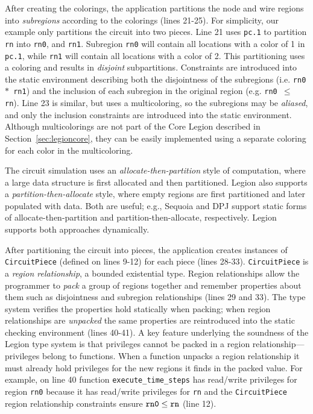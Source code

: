 After creating the colorings, the application partitions the node and wire
regions
into {\em subregions} according to the colorings (lines 21-25).  For
simplicity, our example only partitions the circuit into two pieces.
Line 21 uses {\tt pc.1} to partition {\tt rn} into {\tt rn0}, and {\tt rn1}.
Subregion {\tt rn0} will contain all locations with a color of 1 in {\tt pc.1},
while {\tt rn1} will contain all locations with a color of 2.  This
partitioning uses a coloring and results in {\em disjoint} subpartitions.
Constraints are introduced into the static environment describing both the
disjointness of the subregions (i.e. {\tt rn0 $*$ rn1}) and the inclusion of
each subregion in the original region (e.g. {\tt rn0 $\leq$ rn}).  Line
23 is similar, but uses a multicoloring, so the subregions may be {\em aliased},
and only the inclusion constraints are introduced into the static environment.
Although multicolorings are not part of the Core Legion described in 
Section~\ref{sec:legioncore}, they can be easily implemented using a separate 
coloring for each color in the multicoloring.

The circuit simulation uses an {\em allocate-then-partition} style of
computation, where a large data structure is first allocated and then
partitioned.  Legion also supports a {\em partition-then-allocate} style,
where empty regions are first partitioned and later populated with
data.  Both are useful; e.g., Sequoia \cite{Fatahalian06} and DPJ
\cite{Bocchino09} support static forms of allocate-then-partition and
partition-then-allocate, respectively.  Legion supports both
approaches dynamically.

After partitioning the circuit into pieces, the application creates
instances of {\tt CircuitPiece} (defined on lines 9-12) for each piece
(lines 28-33).  {\tt CircuitPiece} is a {\em region relationship}, a
bounded existential type.  Region relationships allow the programmer
to {\em pack} a group of regions together and remember properties
about them such as disjointness and subregion relationships (lines 29
and 33).  The type system verifies the properties hold statically when
packing; when region relationships are {\em unpacked} the same
properties are reintroduced into the static checking environment
(lines 40-41).  A key feature underlying the soundness of the Legion
type system is that privileges cannot be packed in a region
relationship---privileges belong to functions. When a function unpacks
a region relationship it must already hold privileges for the new
regions it finds in the packed value.  For example, on line 40
function {\tt execute\_time\_steps} has read/write privileges for
region {\tt rn0} because it has read/write privileges for {\tt rn} and
the {\tt CircuitPiece} region relationship constraints ensure $\tt rn0
\leq rn$ (line 12).

